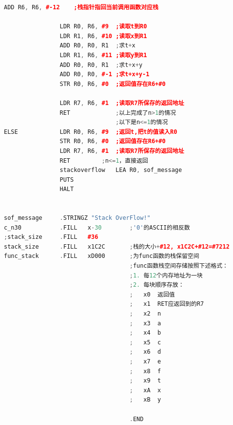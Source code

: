 \documentclass[UTF8]{article}
\begin{document}
\begin{lstlisting}[language=C++]
				ADD	R6, R6, #-12	;栈指针指回当前调用函数对应栈
				
				LDR	R0, R6, #9	;读取t到R0
				LDR	R1, R6, #10	;读取x到R1
				ADD	R0, R0, R1	;求t+x
				LDR	R1, R6, #11	;读取y到R1
				ADD	R0, R0, R1	;求t+x+y
				ADD	R0, R0, #-1	;求t+x+y-1
				STR	R0, R6, #0	;返回值存在R6+#0
				
				LDR	R7, R6, #1	;读取R7所保存的返回地址
				RET				;以上完成了n>1的情况
								;以下是n<=1的情况
ELSE			LDR	R0, R6, #9	;返回t,把t的值读入R0
				STR	R0, R6, #0	;返回值存在R6+#0
				LDR	R7, R6, #1	;读取R7所保存的返回地址
				RET			;n<=1，直接返回
				stackoverflow	LEA	R0, sof_message
				PUTS
				HALT


sof_message		.STRINGZ "Stack OverFlow!"	
c_n30			.FILL	x-30		;'0'的ASCII的相反数
;stack_size		.FILL	#36		
stack_size		.FILL	x1C2C		;栈的大小+#12, x1C2C+#12=#7212
func_stack		.FILL	xD000		;为func函数的栈保留空间
									;func函数栈空间存储按照下述格式：
									;1. 每12个内存地址为一块
									;2. 每块顺序存放：
									;	x0	返回值
									;	x1	RET应返回到的R7
									;	x2	n
									;	x3	a
									;	x4	b
									;	x5	c
									;	x6	d
									;	x7	e
									;	x8	f
									;	x9	t
									;	xA	x
									;	xB	y
									
									.END
\end{lstlisting}\par
	
	
\end{document}
